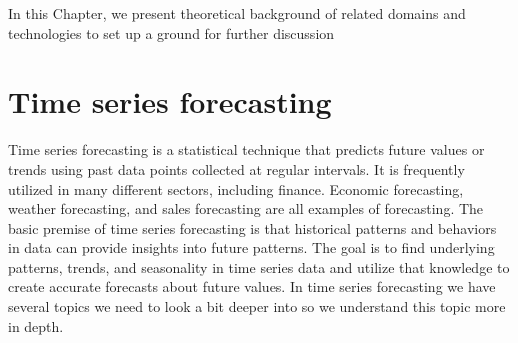\documentclass{imc-inf}
\begin{document}
In this Chapter, we present theoretical background of related domains and technologies to set up a ground for further discussion


\section{Time series forecasting}
Time series forecasting \cite{time_ser} is a statistical technique that predicts future values or trends using past data points collected at regular intervals. It is frequently utilized in many different sectors, including finance.
Economic forecasting, weather forecasting, and sales forecasting are all examples of forecasting.
The basic premise of time series forecasting is that historical patterns and behaviors in data can provide insights into future patterns. The goal is to find underlying patterns, trends, and seasonality in time series data and utilize that knowledge to create accurate forecasts about future values.
In time series forecasting we have several topics we need to look a bit deeper into so we understand this topic more in depth.
\end{document}
